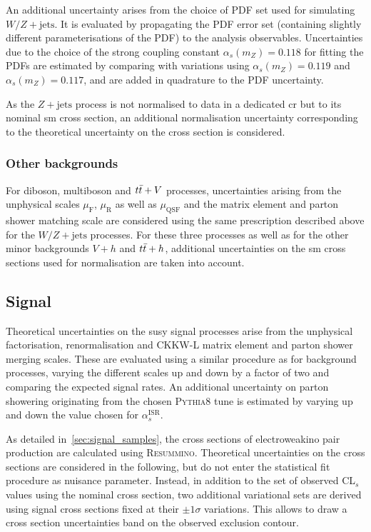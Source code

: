  An additional uncertainty arises from the choice of \gls{PDF} set used for simulating $W/Z+\mathrm{jets}$.
 It is evaluated by propagating the \gls{PDF} error set (containing slightly different parameterisations of the \gls{PDF}) to the analysis observables.
 Uncertainties due to the choice of the strong coupling constant $\alpha_s(m_Z) = 0.118$ for fitting the \glspl{PDF} are estimated by comparing with variations using $\alpha_s(m_Z) = 0.119$ and $\alpha_s(m_Z) = 0.117$, and are added in quadrature to the \gls{PDF} uncertainty.
 
 As the $Z+\mathrm{jets}$ process is not normalised to data in a dedicated \gls{cr} but to its nominal \gls{sm} cross section, an additional normalisation uncertainty corresponding to the theoretical uncertainty on the cross section is considered.
  
 \subsubsection{Other backgrounds}
 
 For diboson, multiboson and $t\bar{t}+V$ processes, uncertainties arising from the unphysical scales $\mu_\mathrm{F}$, $\mu_\mathrm{R}$ as well as $\mu_\mathrm{QSF}$ and the matrix element and parton shower matching scale are considered using the same prescription described above for the $W/Z+\mathrm{jets}$ processes.
 For these three processes as well as for the other minor backgrounds $V+h$ and $t\bar{t}+h$, additional uncertainties on the \gls{sm} cross sections used for normalisation are taken into account.
  
 \subsection{Signal}\label{sec:signal_theory_uncertainties}
 
 Theoretical uncertainties on the \gls{susy} signal processes arise from the unphysical factorisation, renormalisation and CKKW-L matrix element and parton shower merging scales.
 These are evaluated using a similar procedure as for background processes, varying the different scales up and down by a factor of two and comparing the expected signal rates.
 An additional uncertainty on parton showering originating from the chosen \textsc{Pythia8} tune is estimated by varying up and down the value chosen for $\alpha_s^\mathrm{ISR}$.
 
 As detailed in~\cref{sec:signal_samples}, the cross sections of electroweakino pair production are calculated using \textsc{Resummino}. Theoretical uncertainties on the cross sections are considered in the following, but do not enter the statistical fit procedure as nuisance parameter.
 Instead, in addition to the set of observed CL$_s$ values using the nominal cross section, two additional variational sets are derived using signal cross sections fixed at their $\pm 1\sigma$ variations.
 This allows to draw a cross section uncertainties band on the observed exclusion contour. 

